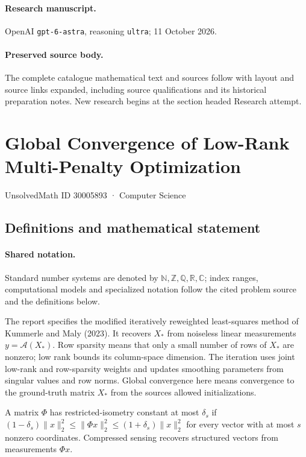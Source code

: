 \documentclass[11pt]{article}
\begin{document}
\paragraph{Research manuscript.} OpenAI \texttt{gpt-6-astra}, reasoning \texttt{ultra}; 11 October 2026.
\paragraph{Preserved source body.} The complete catalogue mathematical text and sources follow with layout and source links expanded, including source qualifications and its historical preparation notes. New research begins at the section headed Research attempt.

\section{Global Convergence of Low-Rank Multi-Penalty Optimization}\label{30005893}
{\small UnsolvedMath ID 30005893 · Computer Science}
\subsection{Definitions and mathematical statement}

\paragraph{Shared notation.}Standard number systems are denoted by $\mathbb N,\mathbb Z,\mathbb Q,\mathbb R,\mathbb C$; index ranges, computational models and specialized notation follow the cited problem source and the definitions below.


The report specifies the modified iteratively reweighted least-squares method of Kummerle and Maly (2023). It recovers $X_*$ from noiseless linear measurements $y=\mathcal A(X_*)$. Row sparsity means that only a small number of rows of $X_*$ are nonzero; low rank bounds its column-space dimension. The iteration uses joint low-rank and row-sparsity weights and updates smoothing parameters from singular values and row norms. Global convergence here means convergence to the ground-truth matrix $X_*$ from the source\textquotesingle s allowed initializations.

A matrix $\Phi$ has restricted-isometry constant at most $\delta_s$ if $(1-\delta_s)\lVert x\rVert_2^2\leq\lVert\Phi x\rVert_2^2\leq(1+\delta_s)\lVert x\rVert_2^2$ for every vector with at most $s$ nonzero coordinates. Compressed sensing recovers structured vectors from measurements $\Phi x$.
\end{document}
